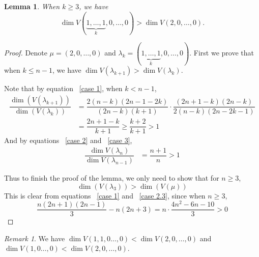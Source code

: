 \documentclass[a4paper]{amsart}
\newcommand{\blue}[1]{{\color{blue}#1}}
\theoremstyle{plain}
\newtheorem{lem}[thm]{Lemma}
\theoremstyle{remark} \newtheorem{remark}[thm]{Remark}
\theoremstyle{remark} \newtheorem{exercise}{Exercise}
\theoremstyle{remark} \newtheorem{example}{Example}
\numberwithin{equation}{section}
\begin{document}
\begin{lem}\label{first type1}
    When $k\geqslant 3$, we have
	\[\dim V(\underbrace{1,\ldots,1}_k,0,\ldots,0)>\dim V(2,0,\ldots,0).\]
    
\end{lem}
\begin{proof}
	Denote $\mu=(2,0,\ldots,0)$ and $\lambda_k=(\underbrace{1,\ldots,1}_k,0,\ldots,0)$. First we prove that when $k\leqslant n-1$, we have $\dim V(\lambda_{k+1})>\dim V(\lambda_k)$. 

Note that by equation ~\eqref{case 1}, when $k<n-1$, 
    \begin{equation}\label{quotient of V(mu)}
    \begin{aligned}
        \dfrac{\dim(V(\lambda_{k+1}))}{\dim(V(\lambda_k))}&=\dfrac{2(n-k)(2n-1-2k)}{(2n-k)(k+1)}\cdot \dfrac{(2n+1-k)(2n-k)}{2(n-k)(2n-2k-1)}\\
        &=\dfrac{2n+1-k}{k+1}\geqslant \dfrac{k+2}{k+1}>1
    \end{aligned}
    \end{equation}
    And by equations ~\eqref{case 2} and ~\eqref{case 3},
    \[\begin{aligned}
    \dfrac{\dim V(\lambda_n)}{\dim V(\lambda_{n-1})}&=\dfrac{n+1}{n}>1
    \end{aligned}
    \]


Thus to finish the proof of the lemma, we only need to show that for $n\geqslant 3$,
\begin{equation}
    \dim(V(\lambda_3))> \dim(V(\mu))
\end{equation}
This is clear from equations ~\eqref{case 1} and ~\eqref{case 2.3}, since when $n\geq 3$,
\[
\dfrac{n(2n+1)(2n-1)}{3}-n(2n+3)=n\cdot \dfrac{4n^2-6n-10}{3}>0
\]

\end{proof}


\begin{remark}
    We have $\dim V(1,1,0\ldots,0)<\dim V(2,0,\ldots,0)$ and $\dim V(1,0\ldots,0)<\dim V(2,0,\ldots,0)$.
\end{remark}
\end{document}
